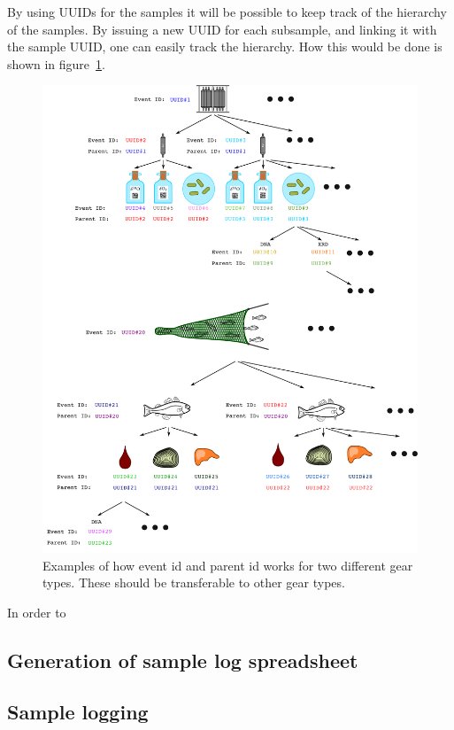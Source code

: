 \documentclass[a4paper,english, 11pt]{article}
\begin{document}
By using UUIDs for the samples it will be possible to keep track of the hierarchy of the samples. By issuing a new UUID for each subsample, and linking it with the sample UUID, one can easily track the hierarchy. How this would be done is shown in figure~\ref{fig:parent_uuid}.
\begin{figure}[htb]
    \centering
    \includegraphics[width=1\textwidth]{Labeling.pdf}
    \caption{\label{fig:parent_uuid}
       Examples of how event id and parent id works for two different gear types. These should be transferable to other gear types.
    }
\end{figure}
In order to 

\subsection{Generation of sample log spreadsheet} %
\label{sub:Sample_log_spreadsheet_generation}


\subsection{Sample logging} %
\label{sub:spreadsheet_reg}
\end{document}
